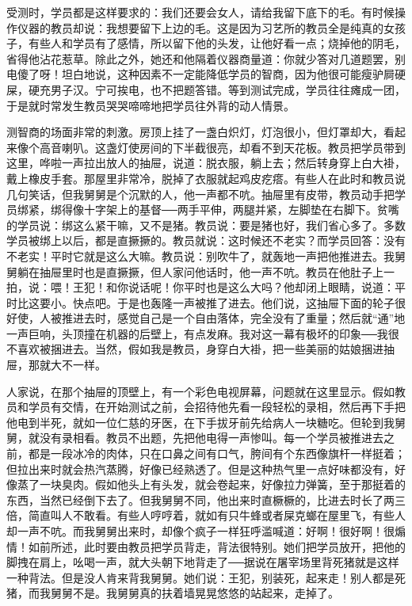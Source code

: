 受测时，学员都是这样要求的：我们还要会女人，请给我留下底下的毛。有时候操作仪器的教员却说：我想要留下上边的毛。这是因为习艺所的教员全是纯真的女孩子，有些人和学员有了感情，所以留下他的头发，让他好看一点；烧掉他的阴毛，省得他沾花惹草。除此之外，她还和他隔着仪器商量道：你就少答对几道题罢，别电傻了呀！坦白地说，这种因素不一定能降低学员的智商，因为他很可能瘦驴屙硬屎，硬充男子汉。宁可挨电，也不把题答错。等到测试完成，学员往往瘫成一团，于是就时常发生教员哭哭啼啼地把学员往外背的动人情景。 

测智商的场面非常的刺激。房顶上挂了一盏白炽灯，灯泡很小，但灯罩却大，看起来像个高音喇叭。这盏灯使房间的下半截很亮，却看不到天花板。教员把学员带到这里，哗啦一声拉出放人的抽屉，说道：脱衣服，躺上去；然后转身穿上白大褂，戴上橡皮手套。那屋里非常冷，脱掉了衣服就起鸡皮疙瘩。有些人在此时和教员说几句笑话，但我舅舅是个沉默的人，他一声都不吭。抽屉里有皮带，教员动手把学员绑紧，绑得像十字架上的基督──两手平伸，两腿并紧，左脚垫在右脚下。贫嘴的学员说：绑这么紧干嘛，又不是猪。教员说：要是猪也好，我们省心多了。多数学员被绑上以后，都是直撅撅的。教员就说：这时候还不老实？而学员回答：没有不老实！平时它就是这么大嘛。教员说：别吹牛了，就轰地一声把他推进去。我舅舅躺在抽屉里时也是直撅撅，但人家问他话时，他一声不吭。教员在他肚子上一拍，说：喂！王犯！和你说话呢！你平时也是这么大吗？他却闭上眼睛，说道：平时比这要小。快点吧。于是也轰隆一声被推了进去。他们说，这抽屉下面的轮子很好使，人被推进去时，感觉自己是一个自由落体，完全没有了重量；然后就“通”地一声巨响，头顶撞在机器的后壁上，有点发麻。我对这一幕有极坏的印象──我很不喜欢被捆进去。当然，假如我是教员，身穿白大褂，把一些美丽的姑娘捆进抽屉，那就大不一样。 

人家说，在那个抽屉的顶壁上，有一个彩色电视屏幕，问题就在这里显示。假如教员和学员有交情，在开始测试之前，会招待他先看一段轻松的录相，然后再下手把他电到半死，就如一位仁慈的牙医，在下手拔牙前先给病人一块糖吃。但轮到我舅舅，就没有录相看。教员不出题，先把他电得一声惨叫。每一个学员被推进去之前，都是一段冰冷的肉体，只在口鼻之间有口气，胯间有个东西像旗杆一样挺着；但拉出来时就会热汽蒸腾，好像已经熟透了。但是这种热气里一点好味都没有，好像蒸了一块臭肉。假如他头上有头发，就会卷起来，好像拉力弹簧，至于那挺着的东西，当然已经倒下去了。但我舅舅不同，他出来时直橛橛的，比进去时长了两三倍，简直叫人不敢看。有些人哼哼着，就如有只牛蜂或者屎克螂在屋里飞，有些人却一声不吭。而我舅舅出来时，却像个疯子一样狂呼滥喊道：好啊！很好啊！很煽情！如前所述，此时要由教员把学员背走，背法很特别。她们把学员放开，把他的脚拽在肩上，吆喝一声，就大头朝下地背走了──据说在屠宰场里背死猪就是这样一种背法。但是没人肯来背我舅舅。她们说：王犯，别装死，起来走！别人都是死猪，而我舅舅不是。我舅舅真的扶着墙晃晃悠悠的站起来，走掉了。 

